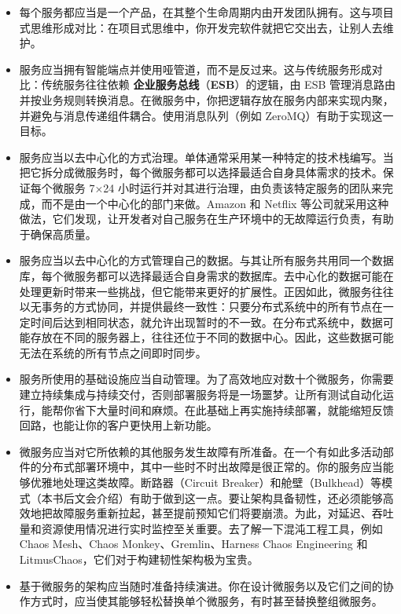 \begin{itemize}
\item 每个服务都应当是一个产品，在其整个生命周期内由开发团队拥有。这与项目式思维形成对比：在项目式思维中，你开发完软件就把它交出去，让别人去维护。
\label{idx:102}
\item 服务应当拥有智能端点并使用哑管道，而不是反过来。这与传统服务形成对比：传统服务往往依赖 \textbf{企业服务总线}（\textbf{ESB}）的逻辑，由 ESB 管理消息路由并按业务规则转换消息。在微服务中，你把逻辑存放在服务内部来实现内聚，并避免与消息传递组件耦合。使用消息队列（例如 ZeroMQ）有助于实现这一目标。
\item 服务应当以去中心化的方式治理。单体通常采用某一种特定的技术栈编写。当把它拆分成微服务时，每个微服务都可以选择最适合自身具体需求的技术。保证每个微服务 7×24 小时运行并对其进行治理，由负责该特定服务的团队来完成，而不是由一个中心化的部门来做。Amazon 和 Netflix 等公司就采用这种做法，它们发现，让开发者对自己服务在生产环境中的无故障运行负责，有助于确保高质量。
\item 服务应当以去中心化的方式管理自己的数据。与其让所有服务共用同一个数据库，每个微服务都可以选择最适合自身需求的数据库。去中心化的数据可能在处理更新时带来一些挑战，但它能带来更好的扩展性。正因如此，微服务往往以无事务的方式协同，并提供最终一致性：只要分布式系统中的所有节点在一定时间后达到相同状态，就允许出现暂时的不一致。在分布式系统中，数据可能存放在不同的服务器上，往往还位于不同的数据中心。因此，这些数据可能无法在系统的所有节点之间即时同步。
\label{idx:103}
\item 服务所使用的基础设施应当自动管理。为了高效地应对数十个微服务，你需要建立持续集成与持续交付，否则部署服务将是一场噩梦。让所有测试自动化运行，能帮你省下大量时间和麻烦。在此基础上再实施持续部署，就能缩短反馈回路，也能让你的客户更快用上新功能。
\item 微服务应当对它所依赖的其他服务发生故障有所准备。在一个有如此多活动部件的分布式部署环境中，其中一些时不时出故障是很正常的。你的服务应当能够优雅地处理这类故障。断路器（Circuit Breaker）和舱壁（Bulkhead）等模式（本书后文会介绍）有助于做到这一点。要让架构具备韧性，还必须能够高效地把故障服务重新拉起，甚至提前预知它们将要崩溃。为此，对延迟、吞吐量和资源使用情况进行实时监控至关重要。去了解一下混沌工程工具，例如 Chaos Mesh、Chaos Monkey、Gremlin、Harness Chaos Engineering 和 LitmusChaos，它们对于构建韧性架构极为宝贵。
\item 基于微服务的架构应当随时准备持续演进。你在设计微服务以及它们之间的协作方式时，应当使其能够轻松替换单个微服务，有时甚至替换整组微服务。
\end{itemize}

